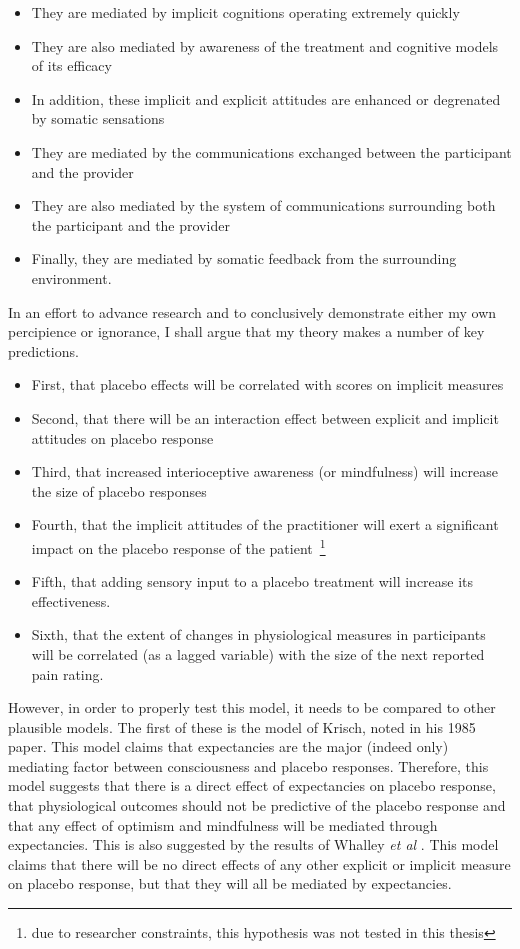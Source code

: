 \begin{itemize}
\item They are mediated by implicit cognitions operating extremely quickly
\item They are also mediated by awareness of the treatment and cognitive models of its efficacy
\item In addition, these implicit and explicit attitudes are enhanced or degrenated by somatic sensations
\item They are mediated by the communications exchanged between the participant and the provider
\item They are also mediated by the system of communications surrounding both the participant and the provider
\item Finally, they are mediated by somatic feedback from the surrounding environment.
\end{itemize}
 
In an effort to advance research and to conclusively demonstrate either my own percipience or ignorance, I shall argue that my theory makes a number of key predictions. 

\begin{itemize}
\item First, that placebo effects will be correlated with scores on implicit measures
\item Second, that there will be an interaction effect between explicit and implicit attitudes on placebo response
\item Third, that increased interioceptive awareness (or mindfulness) will increase the size of placebo responses
\item Fourth, that the implicit attitudes of the practitioner will exert a significant impact on the placebo response of the patient~\footnote{due to researcher constraints, this hypothesis was not tested in this thesis}
\item Fifth, that adding sensory input to a placebo treatment will increase its effectiveness. 
\item Sixth, that the extent of changes in physiological measures in participants will be correlated (as a lagged variable) with the size of the next reported pain rating.
\end{itemize}

However, in order to properly test this model, it needs to be compared to other plausible models. The first of these is the model of Krisch, noted in his 1985 paper. This model claims that expectancies are the major (indeed only) mediating factor between consciousness and placebo responses. Therefore, this model suggests that there is a direct effect of expectancies on placebo response, that physiological outcomes should not be predictive of the placebo response and that any effect of optimism and mindfulness will be mediated through expectancies. This is also suggested by the results of Whalley \textit{et al} \cite{Whalley2008}. This model claims that there will be no direct effects of any other explicit or implicit measure on placebo response, but that they will all be mediated by expectancies. 

